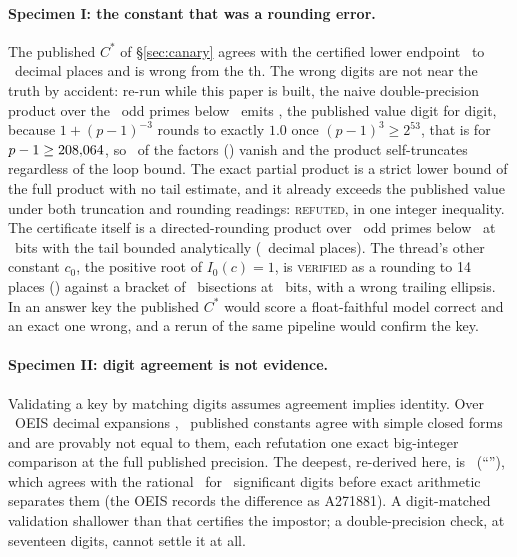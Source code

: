 \documentclass[11pt]{article}
\theoremstyle{definition}
\newcommand{\verdict}[1]{\textsc{#1}}
\begin{document}
\paragraph{Specimen I: the constant that was a rounding error.} The published $C^\ast$ of \S\ref{sec:canary} agrees with the certified lower endpoint \CertLo\ to \AgreePlaces\ decimal places and is wrong from the \FailPlace th. The wrong digits are not near the truth by accident: re-run while this paper is built, the naive double-precision product over the \PrimesCount\ odd primes below \PrimeLimit\ emits \NaiveC, the published value digit for digit, because $1+(p-1)^{-3}$ rounds to exactly $1.0$ once $(p-1)^3\ge2^{53}$, that is for $p-1\ge208{,}064$, so \DroppedPct\ of the factors (\DroppedCount) vanish and the product self-truncates regardless of the loop bound. The exact partial product is a strict lower bound of the full product with no tail estimate, and it already exceeds the published value under both truncation and rounding readings: \verdict{refuted}, in one integer inequality. The certificate itself is a directed-rounding product over \CstarPrimes\ odd primes below \CstarPrimeLimit\ at \CstarBits\ bits with the tail bounded analytically (\CstarDigits\ decimal places). The thread's other constant $c_0$, the positive root of $I_0(c)=1$, is \verdict{verified} as a rounding to 14 places (\CZeroPublished) against a bracket of \CZeroBisections\ bisections at \CZeroBits\ bits, with a wrong trailing ellipsis. In an answer key the published $C^\ast$ would score a float-faithful model correct and an exact one wrong, and a rerun of the same pipeline would confirm the key.

\paragraph{Specimen II: digit agreement is not evidence.} Validating a key by matching digits assumes agreement implies identity. Over \OeisEntries\ OEIS decimal expansions \cite{OEIS}, \ImpostorCount\ published constants agree with simple closed forms and are provably not equal to them, each refutation one exact big-integer comparison at the full published precision. The deepest, re-derived here, is \ImpostorId\ (``\ImpostorName''), which agrees with the rational \ImpostorLabel\ for \ImpostorDepth\ significant digits before exact arithmetic separates them (the OEIS records the difference as A271881). A digit-matched validation shallower than that certifies the impostor; a double-precision check, at seventeen digits, cannot settle it at all.
\end{document}
